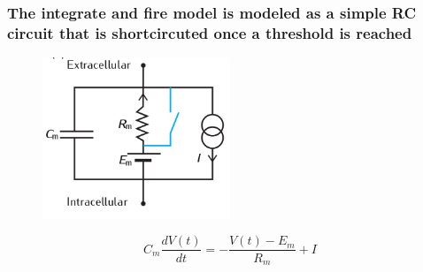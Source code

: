 \documentclass{beamer}
\begin{document}
\begin{frame}
 \frametitle{The integrate and fire model is modeled as a simple RC circuit that is shortcircuted once a threshold is reached}

\begin{figure}
 \includegraphics[width = 0.5\textwidth]{figures/rcA.png}
 \end{figure}
\pause
\begin{equation*}
C_m \frac{dV(t)}{dt} = - \frac{V(t) - E_m}{R_m} + I
\end{equation*}
 \end{frame}




\end{document}
